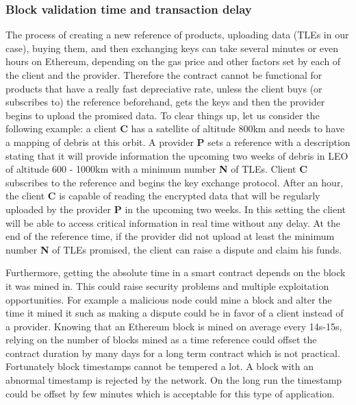 \documentclass[conference]{IEEEtran}
\begin{document}
\medskip

\subsubsection{Block validation time and transaction delay}
The process of creating a new reference of products, uploading data (TLEs in our case), buying them, and then exchanging keys can take several minutes or even hours on Ethereum, depending on the gas price and other factors set by each of the client and the provider. Therefore the contract cannot be functional for products that have a really fast depreciative rate, unless the client buys (or subscribes to) the reference beforehand, gets the keys and then the provider begins to upload the promised data. To clear things up, let us consider the following example: a client \textbf{C} has a satellite of altitude 800km and needs to have a mapping of debris at this orbit. A provider \textbf{P} sets a reference with a description stating that it will provide information the upcoming two weeks of debris in LEO of altitude 600 - 1000km with a minimum number \textbf{N} of TLEs. Client \textbf{C} subscribes to the reference and begins the key exchange protocol. After an hour, the client \textbf{C} is capable of reading the encrypted data that will be regularly uploaded by the provider \textbf{P} in the upcoming two weeks. In this setting the client will be able to access critical information in real time without any delay. At the end of the reference time, if the provider did not upload at least the minimum number \textbf{N} of TLEs promised, the client can raise a dispute and claim his funds.

Furthermore, getting the absolute time in a smart contract depends on the block it was mined in. This could raise security problems and multiple exploitation opportunities. For example a malicious node could mine a block and alter the time it mined it such as making a dispute could be in favor of a client instead of a provider. Knowing that an Ethereum block is mined on average every 14s-15s, relying on the number of blocks mined as a time reference could offset the contract duration by many days for a long term contract which is not practical. Fortunately block timestamps cannot be tempered a lot. A block with an abnormal timestamp \cite{Blockstamp} is rejected by the network. On the long run the timestamp could be offset by few minutes which is acceptable for this type of application.
\medskip
\end{document}
